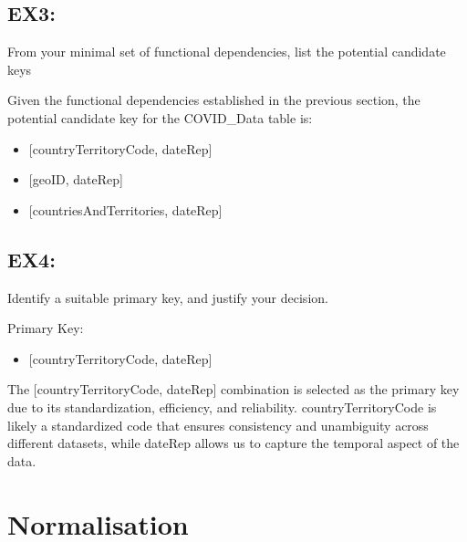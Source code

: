\documentclass{article}
\begin{document}
\vspace{2mm}

\subsection{EX3:} From your minimal set of functional dependencies, list the potential candidate keys

\vspace{10mm}

Given the functional dependencies established in the previous section, the potential candidate key for the COVID\_Data table is:

\begin{itemize}
  \item {[countryTerritoryCode, dateRep]}
  \item {[geoID, dateRep]}
    \item {[countriesAndTerritories, dateRep]}
\end{itemize}


\newpage
\subsection{EX4:} Identify a suitable primary key, and justify your decision.

\vspace{1mm}

  Primary Key:
\begin{itemize}
  \item {[countryTerritoryCode, dateRep]}
\end{itemize}

\vspace{1mm}

The [countryTerritoryCode, dateRep] combination is selected as the primary key due to its standardization, efficiency, and reliability. countryTerritoryCode is likely a standardized code that ensures consistency and unambiguity across different datasets, while dateRep allows us to capture the temporal aspect of the data.



\maketitle
\section{Normalisation}

\vspace{1 mm}
\end{document}

